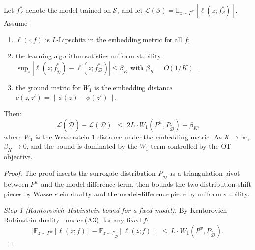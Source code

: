 \begin{foldable}
  \begin{theorem} \label{thm:gap}
    Let $f^*_{\mathcal{S}}$ denote the model trained on $\mathcal{S}$, and let $\mathcal{L}(\mathcal{S}) = \mathbb{E}_{z \sim P^w}[\ell(z; f^*_{\mathcal{S}})]$.
    Assume:
    \begin{enumerate}[label=\textbf{(A\arabic*)},leftmargin=*]
      \item $\ell(\cdot; f)$ is $L$-Lipschitz in the embedding metric for all $f$;
      \item the learning algorithm satisfies uniform stability: $\sup_z |\ell(z; f^*_{\tilde{\mathcal{D}}}) - \ell(z; f^*_\mathcal{D})| \leq \beta_K$ with $\beta_K = O(1/K)$~\cite{bousquet2002stability};
      \item the ground metric for $W_1$ is the embedding distance $c(z, z') = \|\phi(z) - \phi(z')\|$.
    \end{enumerate}
    Then:
    \begin{equation}
      \bigl|\mathcal{L}(\tilde{\mathcal{D}}) - \mathcal{L}(\mathcal{D})\bigr|
      \;\leq\; 2L \cdot W_1(P^w, P_{\tilde{\mathcal{D}}}) + \beta_K,
      \label{eq:gap-bound}
    \end{equation}
    where $W_1$ is the Wasserstein-1 distance under the embedding metric.
    As $K \to \infty$, $\beta_K \to 0$, and the bound is dominated by the $W_1$ term controlled by the \ac{OT} objective.
  \end{theorem}
  \begin{proof}
    The proof inserts the surrogate distribution $P_{\tilde{\mathcal{D}}}$ as a triangulation pivot between $P^w$ and the model-difference term, then bounds the two distribution-shift pieces by Wasserstein duality and the model-difference piece by uniform stability.

    \textit{Step 1 (Kantorovich--Rubinstein bound for a fixed model).}
    By Kantorovich--Rubinstein duality~\cite{villani2008optimal} under (A3), for any fixed $f$:
    \begin{equation*}
      \bigl|\mathbb{E}_{z \sim P^w}[\ell(z; f)] - \mathbb{E}_{z \sim P_{\tilde{\mathcal{D}}}}[\ell(z; f)]\bigr|
      \;\leq\; L \cdot W_1(P^w, P_{\tilde{\mathcal{D}}}).
    \end{equation*}


\end{proof}
\end{foldable}
